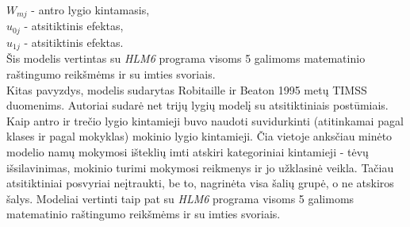 \documentclass[12pt,a4paper]{article}
\begin{document}
$W_{mj}$ - antro lygio kintamasis, \\
$u_{0j}$ - atsitiktinis efektas,\\
$u_{1j}$ - atsitiktinis efektas.\\
Šis modelis vertintas su \textit{HLM6} programa visoms 5 galimoms matematinio raštingumo reikšmėms ir su imties svoriais.\\
\indent Kitas pavyzdys, modelis sudarytas Robitaille ir Beaton \cite{timssLiet} 1995 metų TIMSS duomenims. Autoriai sudarė net trijų lygių modelį su atsitiktiniais postūmiais. Kaip antro ir trečio lygio kintamieji buvo naudoti suvidurkinti (atitinkamai pagal klases ir pagal mokyklas) mokinio lygio kintamieji. Čia vietoje anksčiau minėto modelio namų mokymosi išteklių imti atskiri kategoriniai kintamieji - tėvų išsilavinimas, mokinio turimi mokymosi reikmenys ir jo užklasinė veikla. Tačiau atsitiktiniai posvyriai neįtraukti, be to, nagrinėta visa šalių grupė, o ne atskiros šalys. Modeliai vertinti taip pat su \textit{HLM6} programa visoms 5 galimoms matematinio raštingumo reikšmėms ir su imties svoriais.
\end{document}

